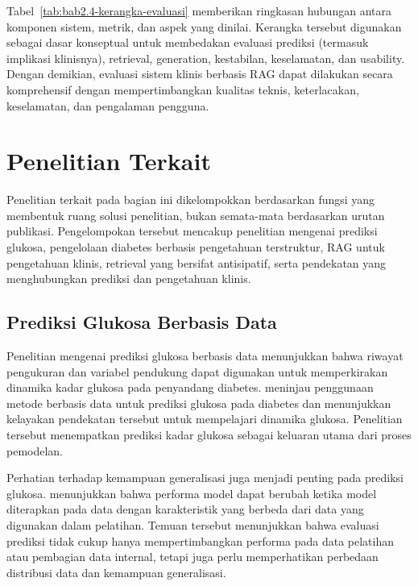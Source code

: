 

Tabel~\ref{tab:bab2.4-kerangka-evaluasi} memberikan ringkasan hubungan antara komponen sistem, metrik, dan aspek yang dinilai. Kerangka tersebut digunakan sebagai dasar konseptual
untuk membedakan evaluasi prediksi (termasuk implikasi klinisnya), retrieval, generation, kestabilan, keselamatan, dan usability. Dengan demikian, evaluasi sistem klinis berbasis RAG dapat dilakukan secara komprehensif 
dengan mempertimbangkan kualitas teknis, keterlacakan, keselamatan, dan pengalaman pengguna.

\section{Penelitian Terkait}
\label{sec:bab2-penelitian-terkait}

Penelitian terkait pada bagian ini dikelompokkan berdasarkan fungsi yang membentuk ruang solusi penelitian, bukan semata-mata berdasarkan urutan publikasi. Pengelompokan
tersebut mencakup penelitian mengenai prediksi glukosa, pengelolaan diabetes berbasis pengetahuan terstruktur, RAG untuk pengetahuan klinis, retrieval yang bersifat
antisipatif, serta pendekatan yang menghubungkan prediksi dan pengetahuan klinis.

\subsection{Prediksi Glukosa Berbasis Data}
\label{subsec:bab2-penelitian-prediksi-glukosa}

Penelitian mengenai prediksi glukosa berbasis data menunjukkan bahwa riwayat pengukuran dan variabel pendukung dapat digunakan untuk memperkirakan dinamika kadar glukosa pada 
penyandang diabetes. \textcite{woldaregay2019} meninjau penggunaan metode berbasis data untuk prediksi glukosa pada diabetes dan menunjukkan kelayakan 
pendekatan tersebut untuk mempelajari dinamika glukosa. Penelitian tersebut menempatkan prediksi kadar glukosa sebagai keluaran utama dari proses pemodelan.

Perhatian terhadap kemampuan generalisasi juga menjadi penting pada prediksi glukosa. \textcite{ghimire2024} menunjukkan bahwa performa model dapat berubah ketika model diterapkan 
pada data dengan karakteristik yang berbeda dari data yang digunakan dalam pelatihan. Temuan tersebut menunjukkan bahwa evaluasi prediksi tidak cukup hanya mempertimbangkan 
performa pada data pelatihan atau pembagian data internal, tetapi juga perlu memperhatikan perbedaan distribusi data dan kemampuan generalisasi.

